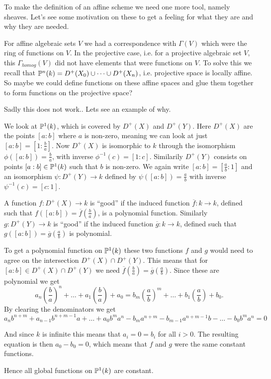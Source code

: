 To make the definition of an affine scheme we need one more tool, namely sheaves. Let's see some motivation on these to get a feeling for what they are and why they are needed. 

For affine algebraic sets $V$ we had a correspondence with $\Gamma(V)$ which were the ring of functions on $V$. In the projective case, i.e. for a projective algebraic set $V$, this $\Gamma_{homog}(V)$ did not have elements that were functions on $V$. To solve this we recall that $\P^n(k)=D^+(X_0)\cup\cdots \cup D^+(X_n)$, i.e. projective space is locally affine. So maybe we could define functions on these affine spaces and glue them together to form functions on the projective space?

Sadly this does not work.. Lets see an example of why. 

\begin{example}
We look at $\P^1(k)$, which is covered by $D^+(X)$ and $D^+(Y)$. Here $D^+(X)$ are the points $[a:b]$ where $a$ is non-zero, meaning we can look at just $[a:b]=[1:\frac{b}{a}]$. Now $D^+(X)$ is isomorphic to $k$ through the isomorphism $\phi([a:b])=\frac{b}{a}$, with inverse $\phi^{-1}(c)=[1:c]$. Similarily $D^+(Y)$ consists on points $[a:b]\in \P^1(k)$ such that $b$ is non-zero. We again write $[a:b]=[\frac{a}{b}:1]$ and an isomorphism $\psi:D^+(Y)\longrightarrow k$ defined by $\psi([a:b])=\frac{a}{b}$ with inverse $\psi^{-1}(c)=[c:1]$. 

A function $f:D^+(X)\longrightarrow k$ is ``good'' if the induced function $\overline{f}: k\longrightarrow k$, defined such that $f([a:b])=\overline{f}(\frac{b}{a})$, is a polynomial function. Similarly $g:D^+(Y)\longrightarrow k$ is ``good'' if the induced function $\overline{g}: k\longrightarrow k$, defined such that $g([a:b])=\overline{g}(\frac{a}{b})$ is polynomial. 

To get a polynomial function on $\P^1(k)$ these two functions $f$ and $g$ would need to agree on the intersection $D^+(X)\cap D^+(Y)$. This means that for $[a:b]\in D^+(X)\cap D^+(Y)$ we need $\overline{f}(\frac{b}{a}) = \overline{g}(\frac{a}{b})$. Since these are polynomial we get 
\begin{equation*}
    a_n(\frac{b}{a})^n+\ldots +a_1(\frac{b}{a})+a_0 = b_m(\frac{a}{b})^m+\ldots +b_1(\frac{a}{b})+b_0.
\end{equation*}
By clearing the denominators we get 
\begin{equation*}
    a_nb^{n+m} + a_{n-1}b^{n+m-1}a+\ldots +a_0b^ma^n - b_ma^{n+m}-b_{m-1}a^{n+m-1}b-\ldots-b_0b^ma^n = 0
\end{equation*}

And since $k$ is infinite this means that $a_i = 0 = b_i$ for all $i>0$. The resulting equation is then $a_0-b_0=0$, which means that $f$ and $g$ were the same constant functions. 

Hence all global functions on $\P^1(k)$ are constant. 
\end{example}

